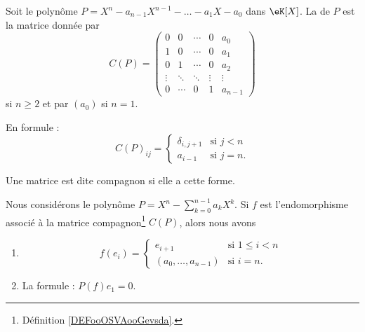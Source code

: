 \begin{definition}      \label{DEFooOSVAooGevsda}
	Soit le polynôme \( P=X^n-a_{n-1}X^{n-1}-\ldots-a_1X-a_0\) dans \( \eK[X]\). La  de \( P\) est la matrice donnée par
	\begin{equation}
		C(P)=\begin{pmatrix}
			0      & 0      & \cdots & 0      & a_0     \\
			1      & 0      & \cdots & 0      & a_1     \\
			0      & 1      & \cdots & 0      & a_2     \\
			\vdots & \ddots & \ddots & \vdots & \vdots  \\
			0      & \cdots & 0      & 1      & a_{n-1}
		\end{pmatrix}
	\end{equation}
	si \( n\geq 2\) et par \( (a_0)\) si \( n=1\).

	En formule :
	\begin{equation}		\label{EQooXKMDooCNxcgK}
		C(P)_{ij}=\begin{cases}
			\delta_{i,j+1} & \text{si } j<n \\
			a_{i-1}        & \text{si }j=n.
		\end{cases}
	\end{equation}

	Une matrice est dite compagnon si elle a cette forme.
\end{definition}

\begin{proposition}     \label{PROPooNDCLooYMGHmX}
	Nous considérons le polynôme \( P=X^n-\sum_{k=0}^{n-1}a_kX^k\). Si \( f\) est l'endomorphisme associé à la matrice compagnon\footnote{Définition \ref{DEFooOSVAooGevsda}.} \( C(P)\), alors nous avons
	\begin{enumerate}
		\item
		      \begin{equation}
			      f(e_i)=\begin{cases}
				      e_{i+1}               & \text{si } 1\leq i<n \\
				      (a_0,\ldots, a_{n-1}) & \text{si } i=n.
			      \end{cases}
		      \end{equation}
		\item
		      La formule : \( P(f)e_1=0\).
	\end{enumerate}
\end{proposition}

